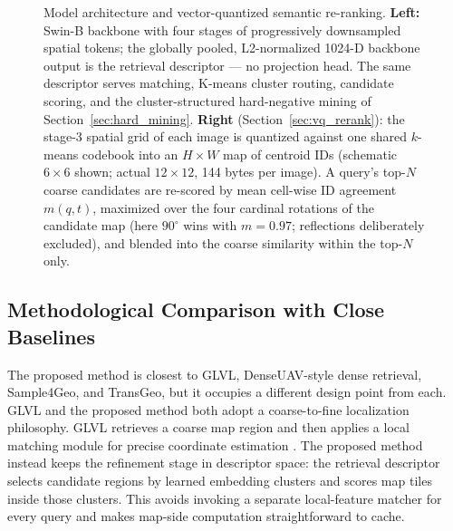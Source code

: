 \documentclass[conference]{IEEEtran}
\begin{document}
\begin{figure}[htbp]
{%
}
\caption{Model architecture and vector-quantized semantic re-ranking.
\textbf{Left:} Swin-B backbone with four stages of progressively downsampled
spatial tokens; the globally pooled, L2-normalized 1024-D backbone output is
the retrieval descriptor — no projection head. The same descriptor serves
matching, K-means cluster routing, candidate scoring, and the
cluster-structured hard-negative mining of Section~\ref{sec:hard_mining}.
\textbf{Right} (Section~\ref{sec:vq_rerank}): the stage-3 spatial grid of
each image is quantized against one shared $k$-means codebook into an
$H{\times}W$ map of centroid IDs (schematic $6{\times}6$ shown; actual
$12{\times}12$, 144 bytes per image). A query's top-$N$ coarse candidates are
re-scored by mean cell-wise ID agreement $m(q,t)$, maximized over the four
cardinal rotations of the candidate map (here $90^\circ$ wins with
$m{=}0.97$; reflections deliberately excluded), and blended into the coarse
similarity within the top-$N$ only.}
\label{fig:architecture}
\end{figure}

\subsection{Methodological Comparison with Close Baselines}
The proposed method is closest to GLVL, DenseUAV-style dense retrieval,
Sample4Geo, and TransGeo, but it occupies a different design point from each.
GLVL and the proposed method both adopt a coarse-to-fine localization
philosophy. GLVL retrieves a coarse map region and then applies a local
matching module for precise coordinate estimation \cite{li2023glvl}. The
proposed method instead keeps the refinement stage in descriptor space: the
retrieval descriptor selects candidate regions by learned embedding clusters and scores
map tiles inside those clusters. This avoids invoking a
separate local-feature matcher for every query and makes map-side computation
straightforward to cache.
\end{document}
